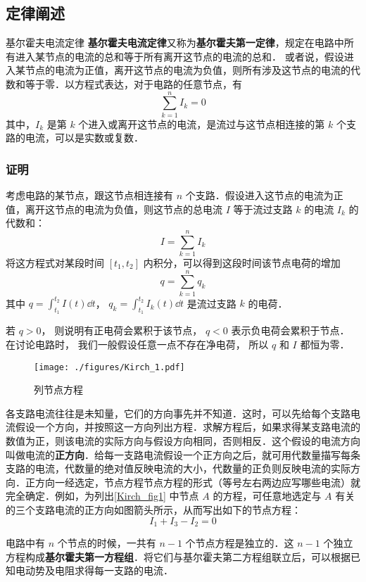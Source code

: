 

\subsection{定律阐述}
\begin{theorem}{基尔霍夫电流定律}
\textbf{基尔霍夫电流定律}又称为\textbf{基尔霍夫第一定律}，规定在电路中所有进入某节点的电流的总和等于所有离开这节点的电流的总和． 或者说，假设进入某节点的电流为正值，离开这节点的电流为负值，则所有涉及这节点的电流的代数和等于零．以方程式表达，对于电路的任意节点，有
\begin{equation}
\sum_{k=1}^n I_k =0
\end{equation}
其中，$I_k$ 是第 $k$ 个进入或离开这节点的电流，是流过与这节点相连接的第 $k$ 个支路的电流，可以是实数或复数．
\end{theorem}

\subsubsection{证明}
考虑电路的某节点，跟这节点相连接有 $n$ 个支路．假设进入这节点的电流为正值，离开这节点的电流为负值，则这节点的总电流 $I$ 等于流过支路 $k$ 的电流 $I_k$ 的代数和：
\begin{equation}
I=\sum_{k=1}^n I_k
\end{equation}
将这方程式对某段时间 $[t_1, t_2]$ 内积分，可以得到这段时间该节点电荷的增加
\begin{equation}
q=\sum_{k=1}^n q_k
\end{equation}
其中 $q = \int_{t_1}^{t_2} I(t) \dd{t}$， $q_k=\int_{t_1}^{t_2} I_k(t) \dd{t}$ 是流过支路 $k$ 的电荷．

若 $q>0$， 则说明有正电荷会累积于该节点， $q < 0$ 表示负电荷会累积于节点． 在讨论电路时， 我们一般假设任意一点不存在净电荷， 所以 $q$ 和 $I$ 都恒为零．

\begin{example}{}

\begin{figure}[ht]
\centering
\texttt{[image: ./figures/Kirch\_1.pdf]}
\caption{列节点方程} \label{Kirch_fig1}
\end{figure}
各支路电流往往是未知量，它们的方向事先并不知道．这时，可以先给每个支路电流假设一个方向，并按照这一方向列出方程．求解方程后，如果求得某支路电流的数值为正，则该电流的实际方向与假设方向相同，否则相反．这个假设的电流方向叫做电流的\textbf{正方向}．给每一支路电流假设一个正方向之后，就可用代数量描写每条支路的电流，代数量的绝对值反映电流的大小，代数量的正负则反映电流的实际方向．正方向一经选定，节点方程节点方程的形式（等号左右两边应写哪些电流）就完全确定．例如，为列出\autoref{Kirch_fig1} 中节点 $A$ 的方程，可任意地选定与 $A $ 有关的三个支路电流的正方向如图箭头所示，从而写出如下的节点方程：
\begin{equation}
I_1+I_3-I_2=0
\end{equation}
\end{example}
电路中有 $n$ 个节点的时候，一共有 $n-1$ 个节点方程是独立的．这 $n-1$ 个独立方程构成\textbf{基尔霍夫第一方程组}．将它们与基尔霍夫第二方程组联立后，可以根据已知电动势及电阻求得每一支路的电流．

